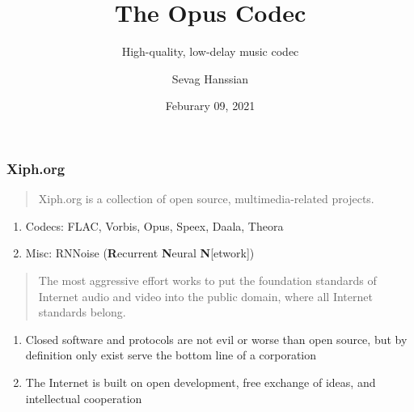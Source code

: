 \documentclass{beamer}
\title{The Opus Codec}
\subtitle{High-quality, low-delay music codec}
\author{Sevag Hanssian}
\date{Feburary 09, 2021}
\institute{MUMT 621, Winter 2021}
\begin{document}
\begin{frame}
\maketitle
\end{frame}

\begin{frame}
	\frametitle{Xiph.org}
	\begin{quote}
		Xiph.org is a collection of open source, multimedia-related projects.
	\end{quote}
	\begin{enumerate}
			\vspace{-0.5em}
		\item
			Codecs: FLAC, Vorbis, Opus, Speex, Daala, Theora
		\item
			Misc: RNNoise (\textbf{R}ecurrent \textbf{N}eural \textbf{N}[etwork])
	\end{enumerate}
	\vspace{1em}
	\begin{quote}
		The most aggressive effort works to put the foundation standards of Internet audio and video into the public domain, where all Internet standards belong.
	\end{quote}
	\begin{enumerate}
			\vspace{-0.5em}
		\item
			Closed software and protocols are not evil or worse than open source, but by definition only exist serve the bottom line of a corporation
		\item
			 The Internet is built on open development, free exchange of ideas, and intellectual cooperation
	\end{enumerate}
\end{frame}

\end{document}
